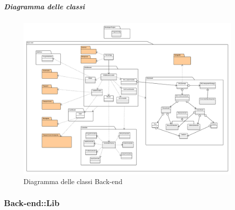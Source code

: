    \subparagraph{Diagramma delle classi}
    \begin{figure}[H]
      \begin{center} 
      	\begin{sideways}
        \includegraphics[scale=0.35]{uml/Back-end-Diagramma delle classi}
        \end{sideways}
        \caption{Diagramma delle classi Back-end}
        
      \end{center}  
    \end{figure} 
  
  \subsubsection{Back-end::Lib}
